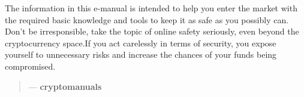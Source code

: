 The information in this e-manual is intended to help you enter the market with the required basic knowledge and tools to keep it as safe as you possibly can. Don't be irresponsible, take the topic of online safety seriously, even beyond the cryptocurrency space.If you act carelessly in terms of security, you expose yourself to unnecessary risks and increase the chances of your funds being compromised.

\begin{quotation}

      \textit{}
        \begin{flushright}
        \small{--- \textbf{cryptomanuals}}
      \end{flushright}
\end{quotation}
    
\medskip

